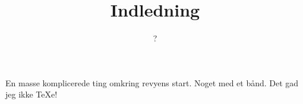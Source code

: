 \documentclass[a4paper,11pt]{article}
\title{Indledning}
\author{?}
\begin{document}
\maketitle

\begin{sketch}

  En masse komplicerede ting omkring revyens start.  Noget med et
  bånd.  Det gad jeg ikke \TeX{}e!

\end{sketch}
\end{document}
